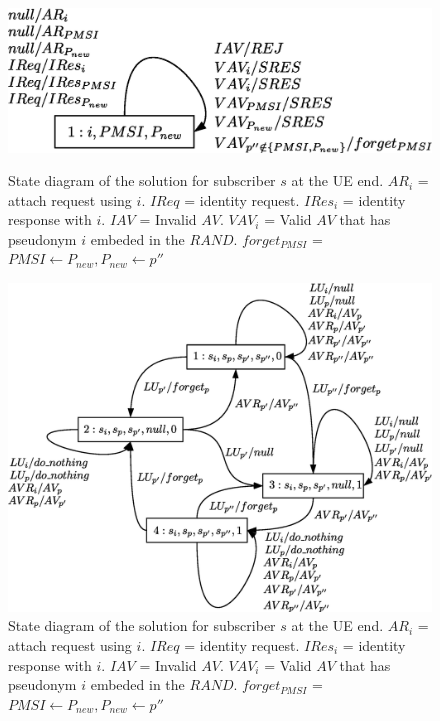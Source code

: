 \documentclass{llncs} %
\begin{document}
\begin{figure}[!tbp]
  \centering
  \begin{minipage}[b]{\textwidth}
    \includegraphics[width=\textwidth]{UE_diagram.eps}
 \caption{State diagram of the solution for subscriber $s$ at the UE end. $AR_{i}$ = attach request using $i$. $IReq$ = identity request. $IRes_{i}$ = identity response with $i$. $IAV$ = Invalid $AV$. $VAV_i$ = Valid $AV$ that has pseudonym $i$ embeded in the $RAND$. $forget_{PMSI}$ = $PMSI \leftarrow P_{new}, P_{new} \leftarrow p''$}
  \label{fig:ue_diagram}
  \end{minipage}
  \hfill
  \begin{minipage}[b]{\textwidth}
    \includegraphics[width=\textwidth]{HN_diagram.eps}
 \caption{State diagram of the solution for subscriber $s$ at the UE end. $AR_{i}$ = attach request using $i$. $IReq$ = identity request. $IRes_{i}$ = identity response with $i$. $IAV$ = Invalid $AV$. $VAV_i$ = Valid $AV$ that has pseudonym $i$ embeded in the $RAND$. $forget_{PMSI}$ = $PMSI \leftarrow P_{new}, P_{new} \leftarrow p''$}
  \label{fig:ue_diagram}
  \end{minipage}
\end{figure}
\end{document}
